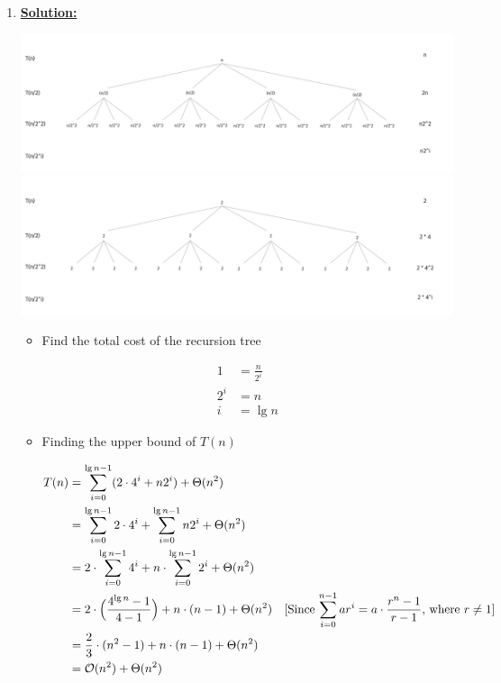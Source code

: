 \documentclass[12pt]{article}
\begin{document}
\begin{enumerate}[1.]
\begin{enumerate}[1.]
    \end{enumerate}

    \item
    \setcounter{equation}{0}
    \underline{\textbf{Solution:}}

    \bigskip

    \begin{center}
    \includegraphics[width=\linewidth]{images/worksheet_0_solution_6.png}
    \includegraphics[width=\linewidth]{images/worksheet_0_solution_7.png}
    \end{center}

    \begin{itemize}
        \item Find the total cost of the recursion tree

        \begin{align}
            1 &= \frac{n}{2^i}\\
            2^i &= n\\
            i &= \lg n
        \end{align}

        \item Finding the upper bound of $T(n)$

        \begin{align}
            T(n) &=  \sum\limits_{i=0}^{\lg n - 1} (2 \cdot 4^i + n2^i) + \Theta(n^2)\\
            &= \sum\limits_{i=0}^{\lg n - 1} 2 \cdot 4^i + \sum\limits_{i=0}^{\lg n - 1} n2^i + \Theta(n^2)\\
            &= 2 \cdot \sum\limits_{i=0}^{\lg n - 1} 4^i + n \cdot \sum\limits_{i=0}^{\lg n - 1} 2^i + \Theta(n^2)\\
            &= 2 \cdot \Bigl( \frac{4^{\lg n} - 1}{4 - 1} \Bigr) + n \cdot ( n - 1) + \Theta(n^2) & [\text{Since $\sum\limits_{i=0}^{n-1} ar^i = a \cdot \frac{r^n - 1}{r - 1}$, where $r \neq 1$}]\\
            &= \frac{2}{3} \cdot ( n^2 - 1)+ n \cdot (n - 1) + \Theta(n^2)\\
            &= \mathcal{O}(n^2) + \Theta(n^2)\\
        \end{align}


\end{itemize}
\end{enumerate}
\end{document}
